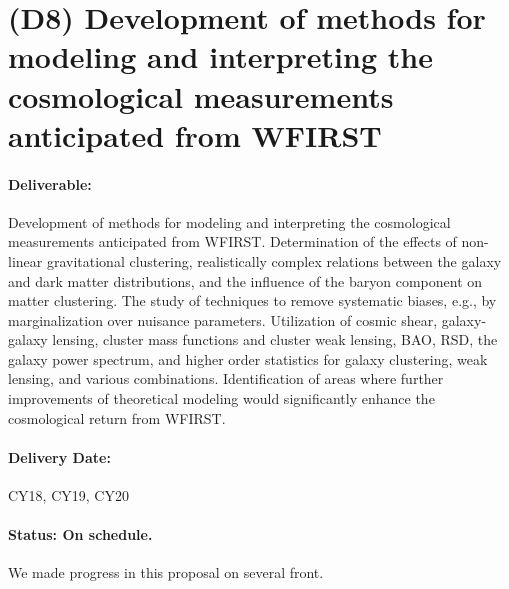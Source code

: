 \section*{(D8) Development of methods for modeling and interpreting the cosmological
measurements anticipated from WFIRST}

\paragraph*{Deliverable:} Development of methods for modeling and interpreting the cosmological measurements anticipated from WFIRST. Determination of the effects of non-linear gravitational clustering, realistically complex relations between the
galaxy and dark matter distributions, and the influence of the baryon
component on matter clustering. The study of techniques to
remove systematic biases, e.g., by marginalization over nuisance
parameters. Utilization of cosmic shear, galaxy-galaxy lensing, cluster mass functions and cluster weak lensing, BAO, RSD, the galaxy
power spectrum, and higher order statistics for galaxy clustering, weak
lensing, and various combinations. Identification of areas where
further improvements of theoretical modeling would significantly
enhance the cosmological return from WFIRST.

\paragraph*{Delivery Date:} CY18, CY19, CY20

\paragraph*{Status: On schedule.} We made progress in this proposal on several front.






